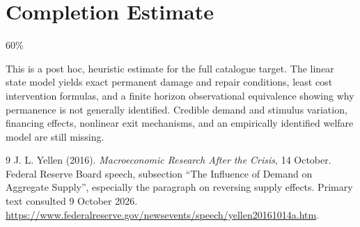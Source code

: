 \documentclass[11pt]{article}
\theoremstyle{remark}
\begin{document}
\section{Completion Estimate}
60\%

This is a post hoc, heuristic estimate for the full catalogue target.
The linear state model yields exact permanent damage and repair conditions, least cost intervention formulas, and a finite horizon observational equivalence showing why permanence is not generally identified. Credible demand and stimulus variation, financing effects, nonlinear exit mechanisms, and an empirically identified welfare model are still missing.

\begin{thebibliography}{9}
 J. L. Yellen (2016).
\emph{Macroeconomic Research After the Crisis}, 14 October.
Federal Reserve Board speech, subsection ``The Influence of Demand on
Aggregate Supply'', especially the paragraph on reversing supply effects.
Primary text consulted 9 October 2026.
\url{https://www.federalreserve.gov/newsevents/speech/yellen20161014a.htm}.
\end{thebibliography}
\end{document}
